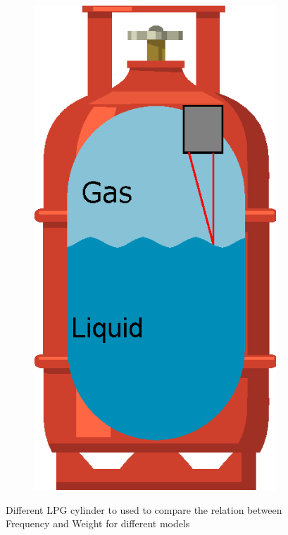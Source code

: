 \begin{figure}[!htp]
\begin{subfigure}{0.15\textwidth}
        \caption{}
    \end{subfigure}
    \begin{subfigure}{0.15\textwidth}
        \centering
        \includegraphics[width=\linewidth]{Chapters/2CHP/Diagrams/bottleBaseoptical.eps}
        \caption{}
    \end{subfigure}
    \caption{Different LPG cylinder to used to compare the relation between Frequency and Weight for different models\citeauthor{wuLiquidLevelDetector2014b}}
 \end{figure}
